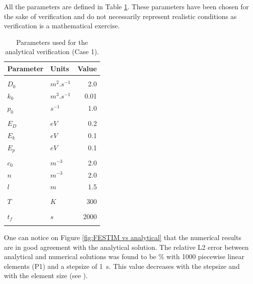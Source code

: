 All the parameters are defined in Table \ref{tab:parameters analytical verification}.
These parameters have been chosen for the sake of verification and do not necessarily represent realistic conditions as verification is a mathematical exercise.
\begin{table}
    \centering
    \begin{tabular}{p{2.3cm} p{2cm} r}
        Parameter & Units & Value \\
        \hline
        \\
        $D_0$ & $\si{m^2.s^{-1}}$ & 2.0 \\
        $k_0$ & $\si{m^3.s^{-1}}$ & 0.01 \\
        $p_0$ & $\si{s^{-1}}$ & 1.0 \\
        \\
        $E_D$ & $\si{eV}$ & 0.2 \\
        $E_k$ & $\si{eV}$ & 0.1 \\
        $E_p$ & $\si{eV}$ & 0.1 \\
        \\
        $c_0$ & $\si{m^{-3}}$ & 2.0 \\
        $n$ & $\si{m^{-3}}$ & 2.0 \\
        $l$ & $\si{m}$ & 1.5\\
        \\
        $T$ & $\si{K}$ & 300 \\
        \\
        $t_f$ & $\si{s}$ & 2000 \\
        \\
    \end{tabular}
    \caption{Parameters used for the analytical verification (Case 1).}
    \label{tab:parameters analytical verification}
\end{table}
One can notice on Figure \ref{fig:FESTIM vs analytical} that the numerical results are in good agreement with the analytical solution.
The relative L2 error between analytical and numerical solutions was found to be  \% with 1000 piecewise linear elements (P1) and a stepsize of \SI{1}{s}.
This value decreases with the stepsize and with the element size (see ).
